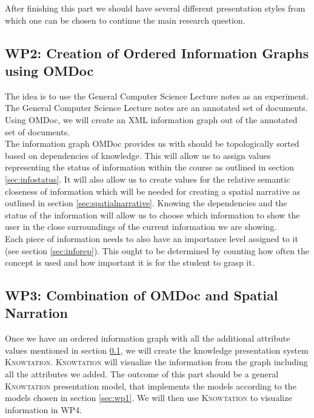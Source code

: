 \documentclass[twoside, 12pt]{article}
\newcommand{\sys}{\textsc{Knowtation}\xspace}
\begin{document}
After finishing this part we should have several different presentation styles from which one can be chosen to continue the main research question.\\ 

\subsection{WP2: Creation of Ordered Information Graphs using OMDoc}
\label{sec:wp2}

The idea is to use the General Computer Science Lecture notes \cite{Kohlhase:GenCSI:base} as an experiment. The General Computer Science Lecture notes are an annotated set of documents. Using OMDoc, we will create an XML information graph out of the annotated set of documents.\\

The information graph OMDoc provides us with should be topologically sorted based on dependencies of knowledge. This will allow us to assign values representing the status of information within the course as outlined in section \ref{sec:infostatus}. It will also allow us to create values for the relative semantic closeness of information which will be needed for creating a spatial narrative as outlined in section \ref{sec:spatialnarrative}. Knowing the dependencies and the status of the information will allow us to choose which information to show the user in the close surroundings of the current information we are showing.\\

Each piece of information needs to also have an importance level assigned to it (see section \ref{sec:inforep}). This ought to be determined by counting how often the concept is used and how important it is for the student to grasp it.\\

\subsection{WP3: Combination of OMDoc and Spatial Narration}
\label{sec:wp3}

Once we have an ordered information graph with all the additional attribute values mentioned in section \ref{sec:wp2}, we will create the knowledge presentation system \sys. \sys will visualize the information from the graph including all the attributes we added. The outcome of this part should be a general \sys presentation model, that implements the models according to the models chosen in section \ref{sec:wp1}. We will then use \sys to visualize information in WP4.\\
\end{document}
